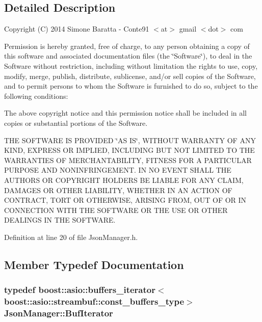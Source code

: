\subsection{Detailed Description}
Copyright (C) 2014 Simone Baratta -\/ Conte91 $<$at$>$ gmail $<$dot$>$ com

Permission is hereby granted, free of charge, to any person obtaining a copy of this software and associated documentation files (the \char`\"{}\+Software\char`\"{}), to deal in the Software without restriction, including without limitation the rights to use, copy, modify, merge, publish, distribute, sublicense, and/or sell copies of the Software, and to permit persons to whom the Software is furnished to do so, subject to the following conditions\+:

The above copyright notice and this permission notice shall be included in all copies or substantial portions of the Software.

T\+H\+E S\+O\+F\+T\+W\+A\+R\+E I\+S P\+R\+O\+V\+I\+D\+E\+D \char`\"{}\+A\+S I\+S\char`\"{}, W\+I\+T\+H\+O\+U\+T W\+A\+R\+R\+A\+N\+T\+Y O\+F A\+N\+Y K\+I\+N\+D, E\+X\+P\+R\+E\+S\+S O\+R I\+M\+P\+L\+I\+E\+D, I\+N\+C\+L\+U\+D\+I\+N\+G B\+U\+T N\+O\+T L\+I\+M\+I\+T\+E\+D T\+O T\+H\+E W\+A\+R\+R\+A\+N\+T\+I\+E\+S O\+F M\+E\+R\+C\+H\+A\+N\+T\+A\+B\+I\+L\+I\+T\+Y, F\+I\+T\+N\+E\+S\+S F\+O\+R A P\+A\+R\+T\+I\+C\+U\+L\+A\+R P\+U\+R\+P\+O\+S\+E A\+N\+D N\+O\+N\+I\+N\+F\+R\+I\+N\+G\+E\+M\+E\+N\+T. I\+N N\+O E\+V\+E\+N\+T S\+H\+A\+L\+L T\+H\+E A\+U\+T\+H\+O\+R\+S O\+R C\+O\+P\+Y\+R\+I\+G\+H\+T H\+O\+L\+D\+E\+R\+S B\+E L\+I\+A\+B\+L\+E F\+O\+R A\+N\+Y C\+L\+A\+I\+M, D\+A\+M\+A\+G\+E\+S O\+R O\+T\+H\+E\+R L\+I\+A\+B\+I\+L\+I\+T\+Y, W\+H\+E\+T\+H\+E\+R I\+N A\+N A\+C\+T\+I\+O\+N O\+F C\+O\+N\+T\+R\+A\+C\+T, T\+O\+R\+T O\+R O\+T\+H\+E\+R\+W\+I\+S\+E, A\+R\+I\+S\+I\+N\+G F\+R\+O\+M, O\+U\+T O\+F O\+R I\+N C\+O\+N\+N\+E\+C\+T\+I\+O\+N W\+I\+T\+H T\+H\+E S\+O\+F\+T\+W\+A\+R\+E O\+R T\+H\+E U\+S\+E O\+R O\+T\+H\+E\+R D\+E\+A\+L\+I\+N\+G\+S I\+N T\+H\+E S\+O\+F\+T\+W\+A\+R\+E. 

Definition at line 20 of file Json\+Manager.\+h.



\subsection{Member Typedef Documentation}
\hypertarget{class_json_manager_a8f05d70930bca17dbe59e4a208398816}{
\subsubsection[{Buf\+Iterator}]{\setlength{\rightskip}{0pt plus 5cm}typedef boost\+::asio\+::buffers\+\_\+iterator$<$boost\+::asio\+::streambuf\+::const\+\_\+buffers\+\_\+type$>$ {\bf Json\+Manager\+::\+Buf\+Iterator}}}\label{class_json_manager_a8f05d70930bca17dbe59e4a208398816}


